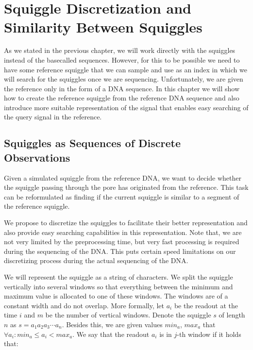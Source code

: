 \chapter{Squiggle Discretization and Similarity Between Squiggles}

\label{kap:proposedMethod}

As we stated in the previous chapter, we will work directly with the squiggles instead
of the basecalled sequences. However, for this to be possible we need to have 
some reference squiggle that we can sample and use as an index in which
we will search for the squiggles once we are sequencing.
Unfortunately, we are given the reference only in the form of a DNA sequence.
In this chapter we will show how to create the reference squiggle from the reference DNA sequence and also
introduce more suitable representation of the signal that enables easy searching of the
query signal in the reference.

\section{Squiggles as Sequences of Discrete Observations}
\label{section:squigglesAsDiscrete}

Given a simulated squiggle from the reference DNA, we want to decide whether the
squiggle passing through the pore has originated from the reference. This task
can be reformulated as finding if the current squiggle is similar to a segment of the reference squiggle.

We propose to discretize the squiggles to facilitate their better representation
and also provide easy searching capabilities in this representation. Note that, we are
not very limited by the preprocessing time, but very fast processing is required during
the sequencing of the DNA. This puts certain speed limitations on our discretizing
process during the actual sequencing of the DNA.

We will represent the squiggle as a string of characters. We split the squiggle
vertically into several windows so that everything between the minimum and maximum
value is allocated to one of these windows. The windows are of a constant width and do not
overlap. More formally, let $a_i$ be the readout at the time $i$ and $m$ be the number of
vertical windows. Denote the squiggle $s$ of length $n$ as $s=a_1a_2a_3\cdots a_n$.
Besides this, we are given values $min_a$, $max_a$ that $\forall a_i: min_a \leq a_i < max_a$.
We say that the readout $a_i$ is in $j$-th window if it holds that:

